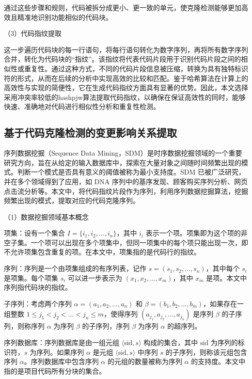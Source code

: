 通过这些步骤和规则，代码被拆分成更小、更一致的单元，使克隆检测能够更加高效且精准地识别功能相似的代码块。

（3）代码指纹提取

这一步遍历代码块的每一行语句，将每行语句转化为数字序列，再将所有数字序列合并，转化为代码块的“指纹”。该指纹将代表代码片段用于识别代码片段之间的相似性或重复性。通过这种方式，不同的代码片段信息被压缩，转换为具有独特标识符的形式，从而在后续的分析中实现高效的比较和匹配。鉴于哈希算法在计算上的高效性与实现的简便性，它在生成代码指纹方面具有显著的优势。因此，本文选择采用冲突率较低的hashpjw算法提取代码指纹，以确保在保证高效性的同时，能够快速、准确地对代码进行相似性分析和重复性检测。


\subsection{基于代码克隆检测的变更影响关系提取}
序列数据挖掘（Sequence Data Mining，SDM）是时序数据挖掘领域的一个重要研究方向，旨在从给定的输入数据库中，探索在大量对象之间随时间频繁出现的模式。判断一个模式是否具有意义的阈值被称为最小支持度。SDM 已被广泛研究，并在多个领域得到了应用，如 DNA 序列中的基序发现、顾客购买序列分析、网页点击流分析等。本文中，将代码指纹片段作为序列，利用序列数据挖掘算法，挖掘频繁出现的模式，提取对应的代码克隆序列。

（1）数据挖掘领域基本概念

项集\cite{2013ClaSP}：设有一个集合 \( I = \{i_1, i_2, \dots, i_n\} \)，其中 \( i_i \) 表示一个项。项集即为这个项的非空子集。一个项可以出现在多个项集中，但同一项集中的每个项只能出现一次，即不允许项集包含重复的项。在本文中，项集指的是代码行的指纹。

序列\cite{2013ClaSP}：序列是一个由项集组成的有序列表，记作 \( s = (s_1, s_2, \dots, s_n) \)，其中每个 \( s_i \) 是项集。每个项集 \( s_i \) 可以进一步表示为 \( (x_1, x_2, \dots, x_m) \)，其中 \( x_m \) 是项。本文中序列指代码块的指纹。

子序列\cite{2013ClaSP}：考虑两个序列 \( \alpha = (a_1, a_2, \dots, a_n) \) 和 \( \beta = (b_1, b_2, \dots, b_m) \)，如果存在一组整数 \( 1 \leq j_1 < j_2 < \dots < j_n \leq m \)，使得序列 \( (a_{j_1}, a_{j_2}, \dots, a_{j_n}) \) 是序列 \( \beta \) 的子序列，则称序列 \( \alpha \) 为序列 \( \beta \) 的子序列，序列 \( \beta \) 为序列 \( \alpha \) 的超序列。

序列数据库\cite{2013ClaSP}：序列数据库是由一组元组 \( \langle \text{sid}, s \rangle \) 构成的集合，其中 \( \text{sid} \) 为序列的标识符，\( s \) 为序列。如果序列 \( \alpha \) 是元组 \( \langle \text{sid}, s \rangle \) 中序列 \( s \) 的子序列，则称该元组包含序列 \( \alpha \)。序列数据库中包含序列 \( \alpha \) 的元组的数量被称为序列 \( \alpha \) 的支持度。本文中指的是项目代码所有分块的集合。

